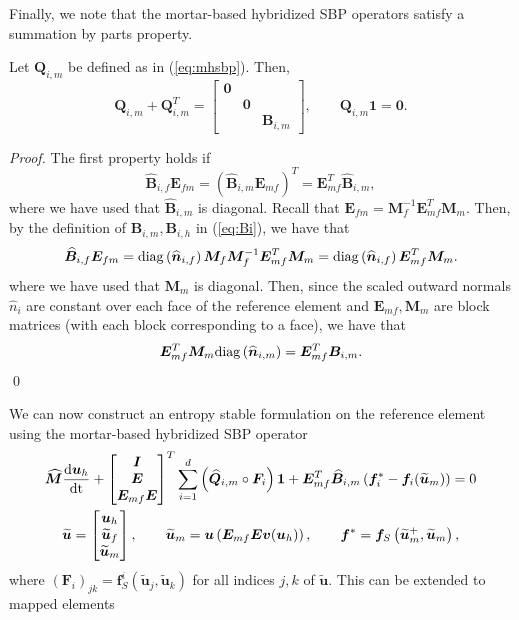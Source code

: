 \documentclass{svjour3}                     %
\renewcommand{\hat}{\widehat}
\renewcommand{\tilde}{\widetilde}
\newcommand{\diag}[1]{{\rm diag}\LRp{#1}}
\newcommand{\td}[2]{\frac{{\rm d}#1}{{\rm d}{\rm #2}}}
\newcommand{\LRp}[1]{\left( #1 \right)}
\begin{document}
Finally, we note that the mortar-based hybridized SBP operators satisfy a summation by parts property.
\begin{lemma}
\label{lemma:mhsbp}
Let $\bm{Q}_{i,m}$ be defined as in (\ref{eq:mhsbp}).  Then, 
\[
\bm{Q}_{i,m} + \bm{Q}_{i,m}^T = \begin{bmatrix}
\bm{0} && \\
&\bm{0} &\\
&& \bm{B}_{i,m}\end{bmatrix}, \qquad \bm{Q}_{i,m}\bm{1} = \bm{0}.
\]
\end{lemma}
\begin{proof}
The first property holds if 
\begin{equation}
\hat{\bm{B}}_{i,f} \bm{E}_{fm} = (\hat{\bm{B}}_{i,m} \bm{E}_{mf})^T = \bm{E}_{mf}^T\hat{\bm{B}}_{i,m},  
\label{eq:mhsbpprop}
\end{equation}
where we have used that $\hat{\bm{B}}_{i,m}$ is diagonal.  Recall that $\bm{E}_{fm} = \bm{M}_f^{-1}\bm{E}_{mf}^T\bm{M}_m$.  
Then, by the definition of $\bm{B}_{i,m},\bm{B}_{i,h}$ in (\ref{eq:Bi}), we have that
\begin{align*}
\hat{\bm{B}}_{i,f} \bm{E}_{fm} = \diag{\hat{\bm{n}}_{i,f}}\bm{M}_f \bm{M}_f^{-1} \bm{E}_{mf}^T\bm{M}_m 
= \diag{\hat{\bm{n}}_{i,f}} \bm{E}_{mf}^T\bm{M}_m.
\end{align*}
where we have used that $\bm{M}_m$ is diagonal.  Then, since the scaled outward normals $\hat{n}_i$  are constant over each face of the reference element and $\bm{E}_{mf}, \bm{M}_m$ are block matrices (with each block corresponding to a face), we have that
\[
\bm{E}_{mf}^T\bm{M}_m \diag{\hat{\bm{n}}_{i,m}}= \bm{E}_{mf}^T\bm{B}_{i,m}.
\]  
\qed\end{proof}

We can now construct an entropy stable formulation on the reference element using the mortar-based hybridized SBP operator
\begin{gather}
\hat{\bm{M}}\td{\bm{u}_h}{t} + \begin{bmatrix} \bm{I} \\ \bm{E} \\ \bm{E}_{mf}\bm{E} \end{bmatrix}^T
\sum_{i=1}^d \LRp{\hat{\bm{Q}}_{i,m} \circ \bm{F}_i}\bm{1} + \bm{E}_{mf}^T\hat{\bm{B}}_{i,m}\LRp{\bm{f}_i^*-\bm{f}_i(\tilde{\bm{u}}_m)} = 0 \label{eq:esdgmref}\\
\tilde{\bm{u}} = \begin{bmatrix}
\bm{u}_h\\
\tilde{\bm{u}}_f\\
\tilde{\bm{u}}_m
\end{bmatrix}, \qquad \tilde{\bm{u}}_m = \bm{u}\LRp{\bm{E}_{mf}\bm{E}\bm{v}(\bm{u}_h)}, \qquad \bm{f}^* = \bm{f}_S\LRp{\tilde{\bm{u}}_m^+,\tilde{\bm{u}}_m},
\end{gather}
where $\LRp{\bm{F}_i}_{jk} = \bm{f}^i_S\LRp{\tilde{\bm{u}}_j,\tilde{\bm{u}}_k}$ for all indices $j,k$ of $\tilde{\bm{u}}$.  This can be extended to mapped elements 
\end{document}
